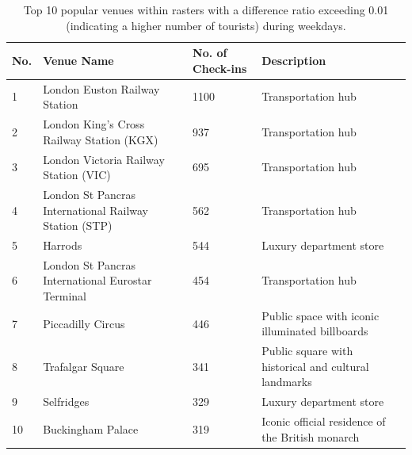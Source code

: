 \documentclass{article}
\theoremstyle{definition}
\theoremstyle{remark}
\begin{document}
\begin{table}[!h]
\centering
\caption{\label{tab:popular_venues_touristspop_weekday}Top 10 popular venues within rasters with a difference ratio exceeding 0.01 (indicating a higher number of tourists) during weekdays.}
\begin{adjustbox}{max width=\textwidth, margin=0cm}
\begin{threeparttable}
\begin{tabular}{lp{5cm}lp{4cm}} \hline
No. & Venue Name & No. of Check-ins & Description \\ \hline
1 & London Euston Railway Station & 1100 & Transportation hub \\
2 & London King's Cross Railway Station (KGX) & 937 & Transportation hub \\
3 & London Victoria Railway Station (VIC) & 695 & Transportation hub \\
4 & London St Pancras International Railway Station (STP) & 562 & Transportation hub \\
5 & Harrods & 544 & Luxury department store \\
6 & London St Pancras International Eurostar Terminal & 454 & Transportation hub \\
7 & Piccadilly Circus & 446 & Public space with iconic illuminated billboards \\
8 & Trafalgar Square & 341 & Public square with historical and cultural landmarks \\
9 & Selfridges & 329 & Luxury department store \\
10 & Buckingham Palace & 319 & Iconic official residence of the British monarch \\ \hline
\end{tabular}
\end{threeparttable}
\end{adjustbox}
\end{table}
\end{document}

